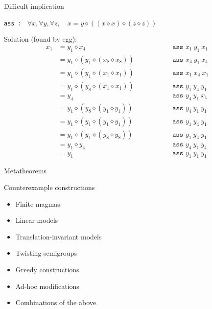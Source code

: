 \documentclass{beamer}
\newcommand{\op}{\diamond}
\begin{document}
\begin{frame}{Difficult implication}

\texttt{ass :   }
$ \forall x, \forall y,\forall z,\quad x = y \op ((x \op x) \op (z \op z)) $
\bigskip

Solution (found by egg):\vspace*{-1mm}
$$
\begin{aligned}
	x_1 & = y_1 \op x_4                 && \qquad \qquad \texttt{ass }x_1\ y_1\ x_1 \\
	& = y_1 \op (y_1 \op (x_8 \op x_8)) && \qquad \qquad \texttt{ass }x_4\ y_1\ x_4 \\
	& = y_1 \op (y_1 \op (x_1 \op x_1)) && \qquad \qquad \texttt{ass }x_1\ x_4\ x_1 \\
	& = y_1 \op (y_8 \op (x_1 \op x_1)) && \qquad \qquad \texttt{ass }y_1\ y_4\ y_1 \\
	& = y_4                             && \qquad \qquad \texttt{ass }y_4\ y_1\ x_1 \\
	& = y_1 \op (y_8 \op (y_1 \op y_1)) && \qquad \qquad \texttt{ass }y_4\ y_1\ y_1 \\
	& = y_1 \op (y_1 \op (y_1 \op y_1)) && \qquad \qquad \texttt{ass }y_1\ y_4\ y_1 \\
	& = y_1 \op (y_1 \op (y_8 \op y_8)) && \qquad \qquad \texttt{ass }y_1\ y_4\ y_1 \\
	& = y_1 \op y_4                     && \qquad \qquad \texttt{ass }y_4\ y_1\ y_4 \\
	& = y_1                             && \qquad \qquad \texttt{ass }y_1\ y_1\ y_1
\end{aligned}
$$

\end{frame}


\begin{frame}{Metatheorems}
\end{frame}


\begin{frame}{Counterexample constructions}

\begin{itemize}
	\item Finite magmas
	\item Linear models
	\item Translation-invariant models
	\item Twisting semigroups
	\item Greedy constructions
	\item Ad-hoc modifications
	\item Combinations of the above
\end{itemize}

\end{frame}
\end{document}
